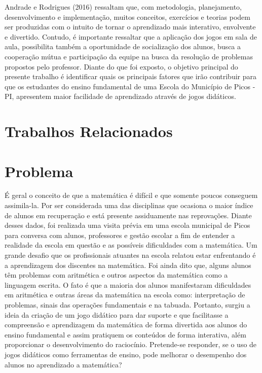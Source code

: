 \documentclass[a4paper,12pt]{article}
\begin{document}
	Andrade e Rodrigues (2016) ressaltam que, com metodologia, planejamento, desenvolvimento e implementação, muitos conceitos, exercícios e teorias podem ser produzidas com o intuito de tornar o aprendizado mais interativo, envolvente e divertido. Contudo, é importante ressaltar que a aplicação dos jogos em sala de aula, possibilita também a oportunidade de socialização dos alunos, busca a cooperação mútua e participação da equipe na busca da resolução de problemas propostos pelo professor.
	Diante do que foi exposto, o objetivo principal do presente trabalho é identificar quais os principais fatores que irão contribuir para que os estudantes do ensino fundamental de uma Escola do Município de Picos - PI, apresentem maior facilidade de aprendizado através de jogos didáticos.



\section{Trabalhos Relacionados}



\section{Problema}
É geral o conceito de que a matemática é difícil e que somente poucos conseguem assimila-la. Por ser considerada uma das disciplinas que ocasiona o maior índice de alunos em recuperação e está presente assiduamente nas reprovações. Diante desses dados, foi realizada uma visita prévia em uma escola municipal de Picos para conversa com alunos, professores e gestão escolar a fim de entender a realidade da escola em questão e as possíveis dificuldades com a matemática. Um grande desafio que os profissionais atuantes na escola relatou estar enfrentando é a aprendizagem dos discentes na matemática.
Foi ainda dito que, alguns alunos têm problemas com aritmética e outros aspectos da matemática como a linguagem escrita.  O fato é que a maioria dos alunos manifestaram dificuldades em aritmética e outras áreas da matemática na escola como: interpretação de problemas, sinais das operações fundamentais e na tabuada.
Portanto, surgiu a ideia da criação de um jogo didático para dar suporte e que facilitasse a compreensão e aprendizagem da matemática de forma divertida aos alunos do ensino fundamental e assim pratiquem os conteúdos de forma interativa, além proporcionar o desenvolvimento do raciocínio.
Pretende-se responder, se o uso de jogos didáticos como ferramentas de ensino, pode melhorar o desempenho dos alunos no aprendizado a matemática?
\end{document}
